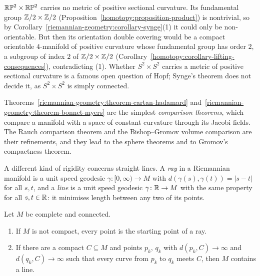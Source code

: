\begin{example}\label{riemannian-geometry:example-synge}
$\mathbb{R}\mathbb{P}^2 \times \mathbb{R}\mathbb{P}^2$ carries no metric of positive sectional curvature. Its fundamental group $\mathbb{Z}/2 \times \mathbb{Z}/2$ (Proposition~\ref{homotopy:proposition-product}) is
nontrivial, so by Corollary~\ref{riemannian-geometry:corollary-synge}(1) it could only be non-orientable. But then its orientation double covering would be a compact
orientable $4$-manifold of positive curvature whose fundamental group has order $2$, a subgroup of index $2$ of $\mathbb{Z}/2 \times \mathbb{Z}/2$
(Corollary~\ref{homotopy:corollary-lifting-consequences}), contradicting (1). Whether $S^2 \times S^2$ carries a metric of positive sectional curvature is a famous open question
of Hopf; Synge's theorem does not decide it, as $S^2 \times S^2$ is simply connected.
\end{example}

\begin{remark}\label{riemannian-geometry:remark-comparison}
Theorems~\ref{riemannian-geometry:theorem-cartan-hadamard} and~\ref{riemannian-geometry:theorem-bonnet-myers} are the simplest \emph{comparison theorems}, which compare a manifold with a space of constant curvature
through its Jacobi fields. The Rauch comparison theorem \cite[Chapter 10]{do-carmo-riemannian} and the Bishop--Gromov volume comparison \cite{lee-riemannian} are their refinements, and they lead to the sphere theorems and to
Gromov's compactness theorem.
\end{remark}

A different kind of rigidity concerns straight lines. A \emph{ray} in a Riemannian manifold is a unit speed geodesic $\gamma \colon [0, \infty) \to M$ with
$d(\gamma(s), \gamma(t)) = |s - t|$ for all $s, t$, and a \emph{line} is a unit speed geodesic $\gamma \colon \mathbb{R} \to M$ with the same property for all $s, t \in \mathbb{R}$: it
minimises length between any two of its points.

\begin{proposition}\label{riemannian-geometry:proposition-rays-lines}
Let $M$ be complete and connected.
\begin{enumerate}
\item If $M$ is not compact, every point is the starting point of a ray.
\item If there are a compact $C \subseteq M$ and points $p_k$, $q_k$ with $d(p_k, C) \to \infty$ and $d(q_k, C) \to \infty$ such that every curve from $p_k$ to $q_k$ meets
$C$, then $M$ contains a line.
\end{enumerate}
\end{proposition}

